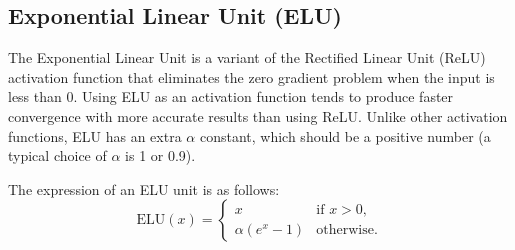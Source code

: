 \documentclass[a3paper,12pt]{extarticle} %
\begin{document}
\subsection*{Exponential Linear Unit (ELU)}
The Exponential Linear Unit is a variant of the Rectified Linear Unit (ReLU) activation function that eliminates the zero gradient problem when the input is less than 0. Using ELU as an activation function tends to produce faster convergence with more accurate results than using ReLU. Unlike other activation functions, ELU has an extra $\alpha$ constant, which should be a positive number (a typical choice of $\alpha$ is 1 or 0.9).

The expression of an ELU unit is as follows:
\[
\text{ELU}(x) = 
\begin{cases} 
x & \text{if } x > 0, \\
\alpha(e^x - 1) & \text{otherwise}.
\end{cases}
\]
\end{document}
